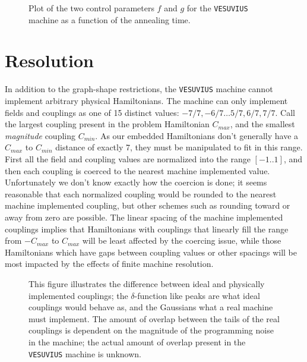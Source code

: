 \begin{figure}
	\caption[\texttt{VESUVIUS Evolution Trajectory}]{Plot of the two control parameters $f$ and $g$ for the \texttt{VESUVIUS} machine as a function of the annealing time.}
	\label{fig:trajectory}
\end{figure}

\section{Resolution}
In addition to the graph-shape restrictions, the \texttt{VESUVIUS} machine cannot implement arbitrary physical Hamiltonians.  The machine can only implement fields and couplings as one of 15 distinct values: $-7/7, -6/7 \dots 5/7,6/7, 7/7$.  Call the largest coupling present in the problem Hamiltonian $C_{max}$, and the smallest \emph{magnitude} coupling $C_{min}$.  As our embedded Hamiltonians don't generally have a $C_{max}$ to $C_{min}$ distance of exactly 7, they must be manipulated to fit in this range.
First  all the field and coupling values are normalized into the range $[-1..1]$, and then each coupling is coerced to the nearest machine implemented value.
Unfortunately we don't know exactly how the coercion is done; it seems reasonable that each normalized coupling would be rounded to the nearest machine implemented coupling, but other schemes such as rounding toward or away from zero are possible.
The linear spacing of the machine implemented couplings implies that Hamiltonians with couplings that linearly fill the range from $-C_{max}$ to $C_{max}$ will be least affected by the coercing issue, while those Hamiltonians which have gaps between coupling values or other spacings will be most impacted by the effects of finite machine resolution.

\begin{figure}
	\caption[Ideal vs. Physical Couplings]{This figure illustrates the difference between ideal and physically implemented couplings; the $\delta$-function like peaks are what ideal couplings would behave as, and the Gaussians what a real machine must implement.  The amount of overlap between the tails of the real couplings is dependent on the magnitude of the programming noise in the machine; the actual amount of overlap present in the \texttt{VESUVIUS} machine is unknown.}
	\label{fig:coupling_spread}
\end{figure}

